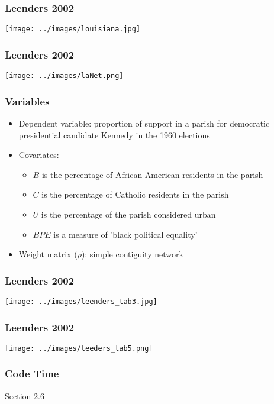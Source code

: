 \documentclass{beamer}
\begin{document}
\begin{frame}
\frametitle{Leenders 2002}
\texttt{[image: ../images/louisiana.jpg]}
\end{frame}
\begin{frame}
\frametitle{Leenders 2002}
\texttt{[image: ../images/laNet.png]}
\end{frame}
\begin{frame}
\frametitle{Variables}
\begin{itemize}
\item Dependent variable: proportion of support in a parish for democratic presidential candidate Kennedy in the 1960 elections
\pause
\item Covariates: 
\begin{itemize}
\pause
\item $B$ is the percentage of African American residents in the parish
\pause
\item $C$ is the percentage of Catholic residents in the parish
\pause
\item $U$ is the percentage of the parish considered urban
\pause
\item $BPE$ is a measure of 'black political equality'
\end{itemize}
\pause
\item Weight matrix ($\rho$): simple contiguity network
\end{itemize}
\end{frame}
\begin{frame}
\frametitle{Leenders 2002}
\texttt{[image: ../images/leenders\_tab3.jpg]}
\end{frame}
\begin{frame}
\frametitle{Leenders 2002}
\texttt{[image: ../images/leeders\_tab5.png]}
\end{frame}
\begin{frame}
\frametitle{Code Time}
Section 2.6
\end{frame}

\end{document}
